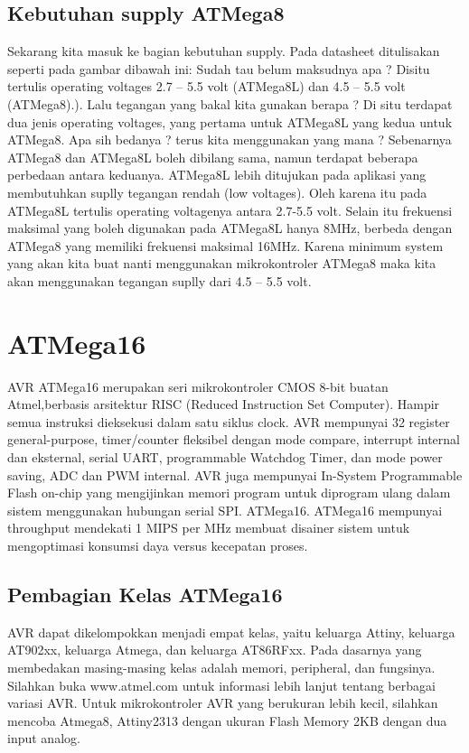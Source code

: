 	\subsection{Kebutuhan supply ATMega8}
		Sekarang kita masuk ke bagian kebutuhan supply. Pada datasheet ditulisakan seperti pada gambar dibawah ini:
		Sudah tau belum maksudnya apa ? Disitu tertulis operating voltages 2.7 – 5.5 volt (ATMega8L) dan 4.5 – 5.5 volt (ATMega8).). Lalu tegangan yang bakal kita gunakan berapa ? Di situ terdapat dua jenis operating voltages, yang pertama untuk ATMega8L yang kedua untuk ATMega8. Apa sih bedanya ? terus kita menggunakan yang mana ? Sebenarnya ATMega8 dan ATMega8L boleh dibilang sama, namun terdapat beberapa perbedaan antara keduanya. ATMega8L lebih ditujukan pada aplikasi yang membutuhkan suplly tegangan rendah (low voltages). Oleh karena itu pada ATMega8L tertulis operating voltagenya antara 2.7-5.5 volt.
		Selain itu frekuensi maksimal yang boleh digunakan pada ATMega8L hanya 8MHz, berbeda dengan ATMega8 yang memiliki frekuensi maksimal 16MHz. Karena minimum system yang akan kita buat nanti menggunakan mikrokontroler ATMega8 maka kita akan menggunakan tegangan suplly dari 4.5 – 5.5 volt.

\section{ATMega16}
		AVR ATMega16 merupakan seri mikrokontroler CMOS 8-bit buatan Atmel,berbasis arsitektur RISC (Reduced Instruction Set Computer). Hampir semua instruksi dieksekusi dalam satu siklus clock. AVR mempunyai 32 register general-purpose, timer/counter fleksibel dengan mode compare, interrupt internal dan eksternal, serial UART, programmable Watchdog Timer, dan mode power saving, ADC dan PWM internal. AVR juga mempunyai In-System Programmable Flash on-chip yang mengijinkan memori program untuk diprogram ulang dalam sistem menggunakan hubungan serial SPI. ATMega16. ATMega16 mempunyai throughput mendekati 1 MIPS per MHz membuat disainer sistem untuk mengoptimasi konsumsi daya versus kecepatan proses.
	\subsection{Pembagian Kelas ATMega16}
		AVR dapat dikelompokkan menjadi empat kelas, yaitu keluarga Attiny, keluarga AT902xx, keluarga Atmega, dan keluarga AT86RFxx. Pada dasarnya yang membedakan masing-masing kelas adalah memori, peripheral, dan fungsinya. Silahkan buka www.atmel.com untuk informasi lebih lanjut tentang berbagai variasi AVR. Untuk mikrokontroler AVR yang berukuran lebih kecil, silahkan mencoba Atmega8, Attiny2313 dengan ukuran Flash Memory 2KB dengan dua input analog.
